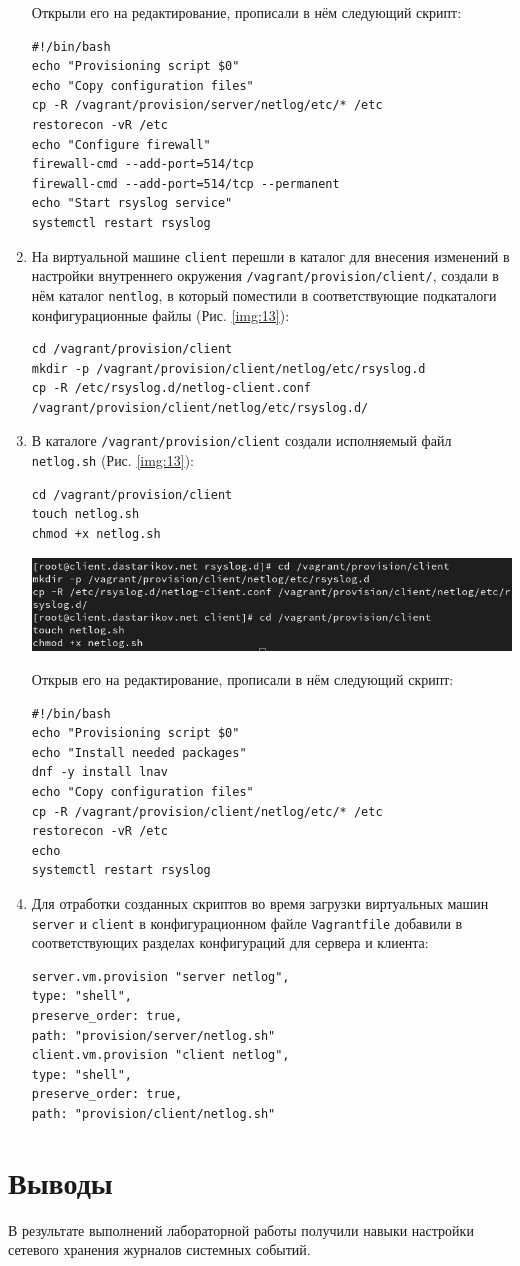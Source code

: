 \begin{enumerate}
Открыли его на редактирование, прописали в нём следующий скрипт:
    \begin{verbatim}
#!/bin/bash
echo "Provisioning script $0"
echo "Copy configuration files"
cp -R /vagrant/provision/server/netlog/etc/* /etc
restorecon -vR /etc
echo "Configure firewall"
firewall-cmd --add-port=514/tcp
firewall-cmd --add-port=514/tcp --permanent
echo "Start rsyslog service"
systemctl restart rsyslog
    \end{verbatim}
\item На виртуальной машине {\tt client} перешли в каталог для внесения изменений в настройки внутреннего окружения {\tt /vagrant/provision/client/}, создали в нём каталог {\tt nentlog}, в который поместили в соответствующие подкаталоги конфигурационные файлы (Рис. \ref{img:13}):
    \begin{verbatim}
cd /vagrant/provision/client
mkdir -p /vagrant/provision/client/netlog/etc/rsyslog.d
cp -R /etc/rsyslog.d/netlog-client.conf /vagrant/provision/client/netlog/etc/rsyslog.d/
    \end{verbatim}
\item В каталоге {\tt /vagrant/provision/client} создали исполняемый файл {\tt netlog.sh} (Рис. \ref{img:13}):
    \begin{verbatim}
cd /vagrant/provision/client
touch netlog.sh
chmod +x netlog.sh
    \end{verbatim}

\begin{center}
    \centering
    \includegraphics[width=\textwidth]{../images/image13.png}
    \label{img:13}
\end{center}

Открыв его на редактирование, прописали в нём следующий скрипт:
    \begin{verbatim}
#!/bin/bash
echo "Provisioning script $0"
echo "Install needed packages"
dnf -y install lnav
echo "Copy configuration files"
cp -R /vagrant/provision/client/netlog/etc/* /etc
restorecon -vR /etc
echo
systemctl restart rsyslog
    \end{verbatim}
\item Для отработки созданных скриптов во время загрузки виртуальных машин {\tt server} и {\tt client} в конфигурационном файле {\tt Vagrantfile} добавили в соответствующих разделах конфигураций для сервера и клиента:
    \begin{verbatim}
server.vm.provision "server netlog",
type: "shell",
preserve_order: true,
path: "provision/server/netlog.sh"
client.vm.provision "client netlog",
type: "shell",
preserve_order: true,
path: "provision/client/netlog.sh"
    \end{verbatim}

\end{enumerate}


\section{Выводы}
В результате выполнений лабораторной работы получили навыки настройки сетевого хранения журналов системных событий.


